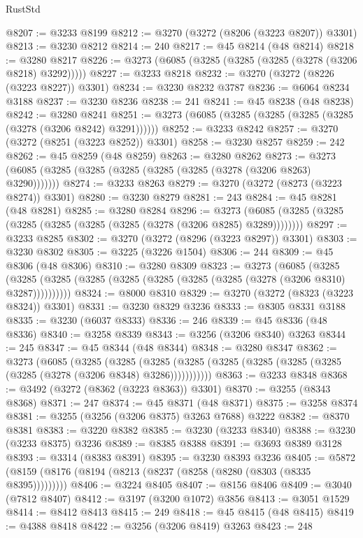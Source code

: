 \begin{lexlean}{RustStd}
\begin{coremodule}
{\begin{coremodule}
{{{{{{{{{{{{{{{{{{{{{{{{{{{{{{{{{{{{{@8207 := @3233 @8199
@8212 := @3270 (@3272 (@8206 (@3223 @8207)) @3301)
@8213 := @3230 @8212
@8214 := 240
@8217 := @45 @8214 (@48 @8214)
@8218 := @3280 @8217
@8226 := @3273 (@6085 (@3285 (@3285 (@3285 (@3278 (@3206 @8218) @3292)))))
@8227 := @3233 @8218
@8232 := @3270 (@3272 (@8226 (@3223 @8227)) @3301)
@8234 := @3230 @8232 @3787
@8236 := @6064 @8234 @3188
@8237 := @3230 @8236
@8238 := 241
@8241 := @45 @8238 (@48 @8238)
@8242 := @3280 @8241
@8251 := @3273 (@6085 (@3285 (@3285 (@3285 (@3285 (@3278 (@3206 @8242) @3291))))))
@8252 := @3233 @8242
@8257 := @3270 (@3272 (@8251 (@3223 @8252)) @3301)
@8258 := @3230 @8257
@8259 := 242
@8262 := @45 @8259 (@48 @8259)
@8263 := @3280 @8262
@8273 := @3273 (@6085 (@3285 (@3285 (@3285 (@3285 (@3285 (@3278 (@3206 @8263) @3290)))))))
@8274 := @3233 @8263
@8279 := @3270 (@3272 (@8273 (@3223 @8274)) @3301)
@8280 := @3230 @8279
@8281 := 243
@8284 := @45 @8281 (@48 @8281)
@8285 := @3280 @8284
@8296 := @3273 (@6085 (@3285 (@3285 (@3285 (@3285 (@3285 (@3285 (@3278 (@3206 @8285) @3289))))))))
@8297 := @3233 @8285
@8302 := @3270 (@3272 (@8296 (@3223 @8297)) @3301)
@8303 := @3230 @8302
@8305 := @3225 (@3226 @1504)
@8306 := 244
@8309 := @45 @8306 (@48 @8306)
@8310 := @3280 @8309
@8323 := @3273
    (@6085
      (@3285 (@3285 (@3285 (@3285 (@3285 (@3285 (@3285 (@3285 (@3278 (@3206 @8310) @3287))))))))))
@8324 := @8000 @8310
@8329 := @3270 (@3272 (@8323 (@3223 @8324)) @3301)
@8331 := @3230 @8329 @3236
@8333 := @8305 @8331 @3188
@8335 := @3230 (@6037 @8333)
@8336 := 246
@8339 := @45 @8336 (@48 @8336)
@8340 := @3258 @8339
@8343 := @3256 (@3206 @8340) @3263
@8344 := 245
@8347 := @45 @8344 (@48 @8344)
@8348 := @3280 @8347
@8362 := @3273
    (@6085
      (@3285
        (@3285
          (@3285 (@3285 (@3285 (@3285 (@3285 (@3285 (@3285 (@3278 (@3206 @8348) @3286)))))))))))
@8363 := @3233 @8348
@8368 := @3492 (@3272 (@8362 (@3223 @8363)) @3301)
@8370 := @3255 (@8343 @8368)
@8371 := 247
@8374 := @45 @8371 (@48 @8371)
@8375 := @3258 @8374
@8381 := @3255 (@3256 (@3206 @8375) @3263 @7688) @3222
@8382 := @8370 @8381
@8383 := @3220 @8382
@8385 := @3230 (@3233 @8340)
@8388 := @3230 (@3233 @8375) @3236
@8389 := @8385 @8388
@8391 := @3693 @8389 @3128
@8393 := @3314 (@8383 @8391)
@8395 := @3230 @8393 @3236
@8405 := @5872 (@8159 (@8176 (@8194 (@8213 (@8237 (@8258 (@8280 (@8303 (@8335 @8395)))))))))
@8406 := @3224 @8405
@8407 := @8156 @8406
@8409 := @3040 (@7812 @8407)
@8412 := @3197 (@3200 @1072) @3856
@8413 := @3051 @1529
@8414 := @8412 @8413
@8415 := 249
@8418 := @45 @8415 (@48 @8415)
@8419 := @4388 @8418
@8422 := @3256 (@3206 @8419) @3263
@8423 := 248
}}}}}}}}}}}}}}}}}}}}}}}}}}}}}}}}}}}}}
\end{coremodule}}
\end{coremodule}
\end{lexlean}
